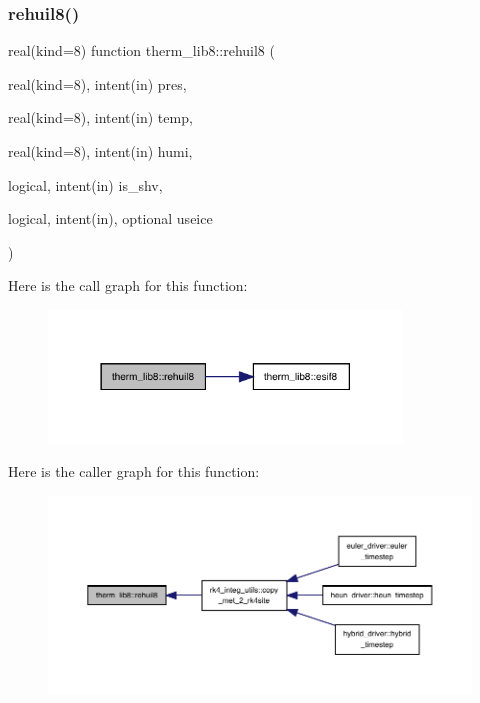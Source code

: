 \subsubsection{\texorpdfstring{rehuil8()}{rehuil8()}}
{\footnotesize\ttfamily real(kind=8) function therm\+\_\+lib8\+::rehuil8 (\begin{DoxyParamCaption}\item[{real(kind=8), intent(in)}]{pres,  }\item[{real(kind=8), intent(in)}]{temp,  }\item[{real(kind=8), intent(in)}]{humi,  }\item[{logical, intent(in)}]{is\+\_\+shv,  }\item[{logical, intent(in), optional}]{useice }\end{DoxyParamCaption})}

Here is the call graph for this function\+:
\nopagebreak
\begin{figure}[H]
\begin{center}
\leavevmode
\includegraphics[width=266pt]{namespacetherm__lib8_a51fbba130b3fc3a6cc1744aeb76a2b81_cgraph}
\end{center}
\end{figure}
Here is the caller graph for this function\+:
\nopagebreak
\begin{figure}[H]
\begin{center}
\leavevmode
\includegraphics[width=350pt]{namespacetherm__lib8_a51fbba130b3fc3a6cc1744aeb76a2b81_icgraph}
\end{center}
\end{figure}
\mbox{\label{namespacetherm__lib8_a00df68c843939c4d08f0e8ef99ad4fba}} 
